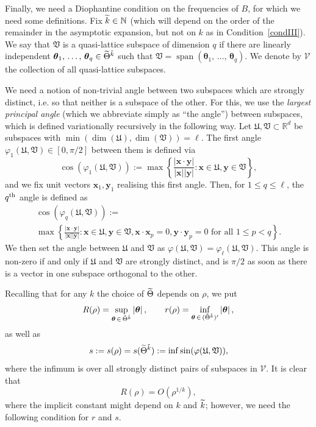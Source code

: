 \documentclass[AHL,Unicode,longabstracts,published]{cedram}
\DeclareMathOperator{\spann}{span}
\newcommand{\R}{\mathbb R}
\newcommand{\N}{\mathbb N}
\newcommand{\CV}{\mathcal{V}}
\newcommand{\btheta}{\boldsymbol \theta}
\newcommand{\bx}{\mathbf x}
\newcommand{\by}{\mathbf y}
\newcommand{\FU}{\mathfrak U}
\newcommand{\FV}{\mathfrak V}
\renewcommand{\phi}{\varphi}
\newcommand{\bigo}[1]{O\left(#1 \right)}
\newcommand{\abs}[1]{\left\lvert #1 \right\rvert}
\newcommand{\set}[1]{\left\{ #1 \right\}}
\let\oldtilde\tilde
\renewcommand*{\tilde}[1]{\mathchoice{\widetilde{#1}}{\widetilde{#1}}{\oldtilde{#1}}{\oldtilde{#1}}}
\begin{document}
Finally, we need a Diophantine condition on the frequencies of $B$, for which we need some definitions. Fix $\tilde k \in \N$ (which will depend on the order of the remainder in the asymptotic expansion, but not on $k$ as in Condition~\ref{condIII}). We say that $\FV$ is a quasi-lattice subspace of dimension $q$ if there are linearly independent $\btheta_1,\,\dotsc,\,\btheta_q \in \tilde \Theta^{\tilde k}$ such that $\FV = \spann(\btheta_1,\,\dotsc,\,\btheta_q)$. We denote by $\CV$ the collection of all quasi-lattice subspaces.

We need a notion of non-trivial angle between two subspaces which are strongly distinct, i.e. so that neither is a subspace of the other. For this, we use the
\emph{largest principal angle} (which we abbreviate simply as ``the angle'') between subspaces, which is defined variationally recursively in the following way. Let $\FU, \FV \subset \R^d$ be subspaces with $\min(\dim(\FU),\dim(\FV)) = \ell$. The first angle $\phi_1(\FU,\FV) \in [0,\pi/2]$ between them is defined via
\begin{equation}
\cos(\phi_1(\FU,\FV)) := \max \set{\frac{\abs{\bx \cdot \by}}{\abs \bx \abs \by} : \bx \in \FU, \by \in \FV},
\end{equation}
and we fix unit vectors $\bx_1, \by_1$ realising this first angle. Then, for $1
\le q \le \ell$, the $q^{\rm th}$ angle is defined as
\begin{multline}
\cos(\phi_q(\FU,\FV)) :=\\
\max \set{\frac{\abs{\bx \cdot \by}}{\abs \bx \abs \by} : \bx \in \FU, \by \in \FV, \bx \cdot \bx_p = 0, \by \cdot \by_p = 0
\text{ for all } 1 \le p < q}.
\end{multline}
We then set the angle between $\FU$ and $\FV$ as $\phi(\FU,\FV) =
\phi_\ell(\FU,\FV)$. This angle is non-zero if and only if $\FU$ and $\FV$ are strongly distinct, and is $\pi/2$ as soon as there is a vector in one subspace orthogonal to the other.

Recalling that for any $k$ the choice of $\tilde \Theta$ depends on $\rho$, we put
\begin{equation}\label{eq:defnrR}
R(\rho) = \sup_{\btheta\,\in\,\tilde \Theta^{\tilde k}} \abs \btheta, \qquad r(\rho) = \inf_{\btheta\,\in\,(\tilde \Theta^{\tilde k})'} \abs \btheta,
\end{equation}
as well as
\begin{equation}
s := s(\rho) = s(\tilde \Theta^{\tilde k}) := \inf \sin(\phi(\FU,\FV)),
\end{equation}
where the infimum is over all strongly distinct pairs of subspaces in $\CV$. It is clear that
\begin{equation}\label{eq:boundonR}
R(\rho) = \bigo{\rho^{1/k}},
\end{equation}
where the implicit constant might depend on $k$ and $\tilde k$; however, we need the following condition for $r$ and $s$.
\end{document}
